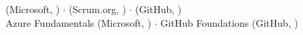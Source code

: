 \CertificationAzureDeveloper{} (Microsoft, \CertificationAzureDate) $\cdot$ \CertificationScrum{} (Scrum.org, \CertificationScrumDate) $\cdot$ \CertificationGithubActions{} (GitHub, \CertificationGithubActionsDate)\\
Azure Fundamentals (Microsoft, \CertificationFundamentalsDate) $\cdot$ GitHub Foundations (GitHub, \CertificationGithubFoundationsDate)
